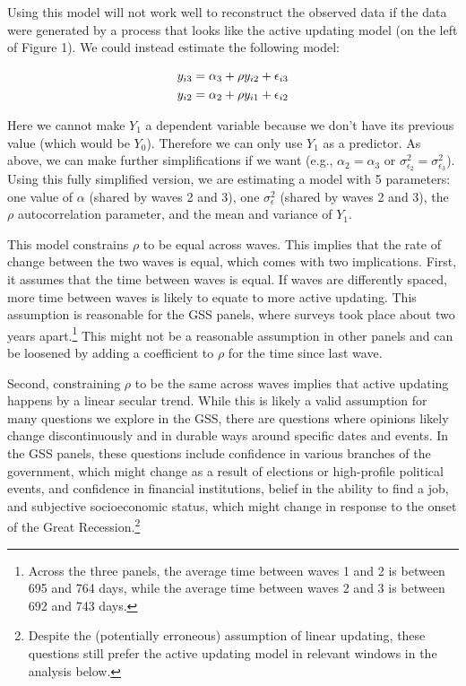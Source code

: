 \documentclass[
  11pt,
]{article}
\begin{document}
Using this model will not work well to reconstruct the observed data if the data were generated by a process that looks like the active updating model (on the left of Figure 1). We could instead estimate the following model:

\begin{eqnarray}
  y_{i3} = \alpha_3 + \rho y_{i2} + \epsilon_{i3} \\ 
  y_{i2} = \alpha_2 + \rho y_{i1} + \epsilon_{i2} \notag
\end{eqnarray}

Here we cannot make \(Y_1\) a dependent variable because we don't have its previous value (which would be \(Y_0\)). Therefore we can only use \(Y_1\) as a predictor. As above, we can make further simplifications if we want (e.g., \(\alpha_2 = \alpha_3\) or \(\sigma^2_{\epsilon_2} = \sigma^2_{\epsilon_3}\)). Using this fully simplified version, we are estimating a model with 5 parameters: one value of \(\alpha\) (shared by waves 2 and 3), one \(\sigma^2_{\epsilon}\) (shared by waves 2 and 3), the \(\rho\) autocorrelation parameter, and the mean and variance of \(Y_1\).

This model constrains \(\rho\) to be equal across waves. This implies that the rate of change between the two waves is equal, which comes with two implications. First, it assumes that the time between waves is equal. If waves are differently spaced, more time between waves is likely to equate to more active updating. This assumption is reasonable for the GSS panels, where surveys took place about two years apart.\footnote{Across the three panels, the average time between waves 1 and 2 is between 695 and 764 days, while the average time between waves 2 and 3 is between 692 and 743 days.} This might not be a reasonable assumption in other panels and can be loosened by adding a coefficient to \(\rho\) for the time since last wave.

Second, constraining \(\rho\) to be the same across waves implies that active updating happens by a linear secular trend. While this is likely a valid assumption for many questions we explore in the GSS, there are questions where opinions likely change discontinuously and in durable ways around specific dates and events. In the GSS panels, these questions include confidence in various branches of the government, which might change as a result of elections or high-profile political events, and confidence in financial institutions, belief in the ability to find a job, and subjective socioeconomic status, which might change in response to the onset of the Great Recession.\footnote{Despite the (potentially erroneous) assumption of linear updating, these questions still prefer the active updating model in relevant windows in the analysis below.}
\end{document}
